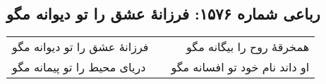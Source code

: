 \begin{center}
\section*{رباعی شماره ۱۵۷۶: فرزانهٔ عشق را تو دیوانه مگو}
\label{sec:1576}
\begin{longtable}{l p{0.5cm} r}
فرزانهٔ عشق را تو دیوانه مگو
&&
همخرقهٔ روح را بیگانه مگو
\\
دریای محیط را تو پیمانه مگو
&&
او داند نام خود تو افسانه مگو
\\
\end{longtable}
\end{center}
